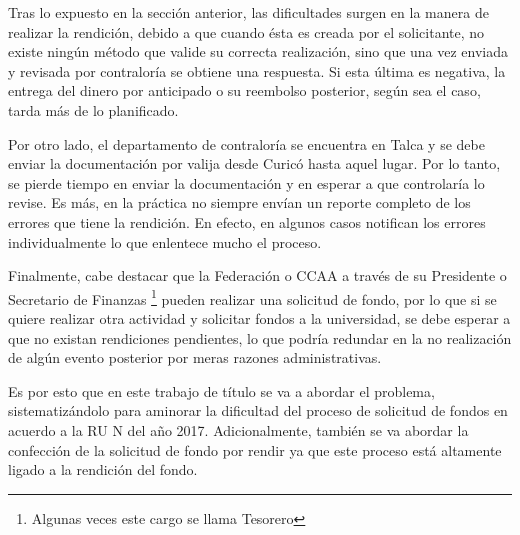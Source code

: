 Tras lo expuesto en la sección anterior, las dificultades surgen en la manera de realizar la rendición, debido a que cuando ésta es creada por el solicitante, no existe ningún método que valide su correcta realización, sino que una vez enviada y revisada por contraloría se obtiene una respuesta. Si esta última es negativa, la entrega del dinero por anticipado o su reembolso posterior, según sea el caso, tarda más de lo planificado.

Por otro lado, el departamento de contraloría se encuentra en Talca y se debe enviar la documentación por valija desde Curicó hasta aquel lugar. Por lo tanto, se pierde tiempo en enviar la documentación y en esperar a que controlaría lo revise. Es más, en la práctica no siempre envían un reporte completo de los errores que tiene la rendición. En efecto, en algunos casos notifican los errores individualmente lo que enlentece mucho el proceso.

Finalmente, cabe destacar que la Federación o CCAA a través de su Presidente o Secretario de Finanzas \footnote{Algunas veces este cargo se llama Tesorero} pueden realizar una solicitud de fondo, por lo que si se quiere realizar otra actividad y solicitar fondos a la universidad, se debe esperar a que no existan rendiciones pendientes, lo que podría redundar en la no realización de algún evento posterior por meras razones administrativas.

Es por esto que en este trabajo de título se va a abordar el problema, sistematizándolo para aminorar la dificultad del proceso de solicitud de fondos en acuerdo a la RU N del año 2017. Adicionalmente, también se va abordar la confección de la solicitud de fondo por rendir ya que este proceso está altamente ligado a la rendición del fondo.
